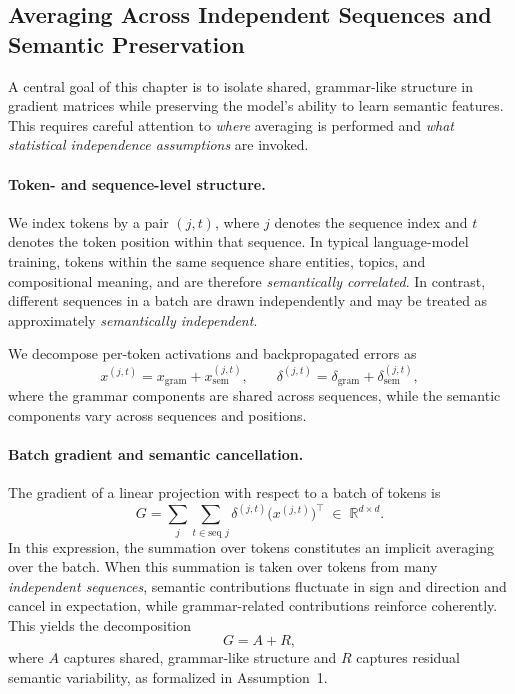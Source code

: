 \subsection{Averaging Across Independent Sequences and Semantic Preservation}
\label{sec:sequence_level_averaging}

A central goal of this chapter is to isolate shared, grammar-like structure in
gradient matrices while preserving the model’s ability to learn semantic features.
This requires careful attention to \emph{where} averaging is performed and
\emph{what statistical independence assumptions} are invoked.

\paragraph{Token- and sequence-level structure.}
We index tokens by a pair $(j,t)$, where $j$ denotes the sequence index and $t$
denotes the token position within that sequence.
In typical language-model training, tokens within the same sequence share entities,
topics, and compositional meaning, and are therefore \emph{semantically correlated}.
In contrast, different sequences in a batch are drawn independently and may be
treated as approximately \emph{semantically independent}.

We decompose per-token activations and backpropagated errors as
\[
x^{(j,t)} = x_{\mathrm{gram}} + x_{\mathrm{sem}}^{(j,t)},
\qquad
\delta^{(j,t)} = \delta_{\mathrm{gram}} + \delta_{\mathrm{sem}}^{(j,t)},
\]
where the grammar components are shared across sequences, while the semantic
components vary across sequences and positions.

\paragraph{Batch gradient and semantic cancellation.}
The gradient of a linear projection with respect to a batch of tokens is
\[
G
=
\sum_{j} \sum_{t \in \text{seq } j}
\delta^{(j,t)} \bigl(x^{(j,t)}\bigr)^\top
\;\in\;
\mathbb{R}^{d\times d}.
\]
In this expression, the summation over tokens constitutes an implicit averaging
over the batch.
When this summation is taken over tokens from many \emph{independent sequences},
semantic contributions fluctuate in sign and direction and cancel in expectation,
while grammar-related contributions reinforce coherently.
This yields the decomposition
\[
G = A + R,
\]
where $A$ captures shared, grammar-like structure and $R$ captures residual
semantic variability, as formalized in Assumption~1.

